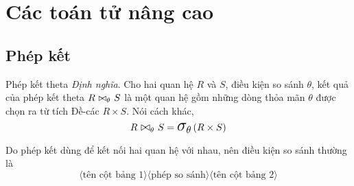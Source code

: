\documentclass[11pt]{beamer}
\newcommand{\mmm}[1]{\mathlarger{\mathlarger{\mathlarger#1}}}%
\newcommand{\psig}[2]{\mmm{\sigma}_{#1}\left(#2\right)}%
\begin{document}
  \section{Các toán tử nâng cao}
  \subsection{Phép kết}
  \begin{frame}{Phép kết theta}
    \textit{Định nghĩa}. Cho hai quan hệ $R$ và $S$, điều kiện so sánh $\theta$, kết quả của phép kết theta
    $R \join[\theta] S$ là một quan hệ gồm những dòng thỏa mãn $\theta$ được chọn ra từ tích Đề-các $R \times S$.
    Nói cách khác,
    $$
    R \join[\theta] S = \psig{\theta}{R \times S}
    $$
  \end{frame}
  \begin{frame}
    Do phép kết dùng để kết nối hai quan hệ với nhau, nên điều kiện so sánh thường là
    $$\langle\text{tên cột bảng 1}\rangle\langle\text{phép so sánh}\rangle\langle\text{tên cột bảng 2}\rangle$$
  \end{frame}
\end{document}
